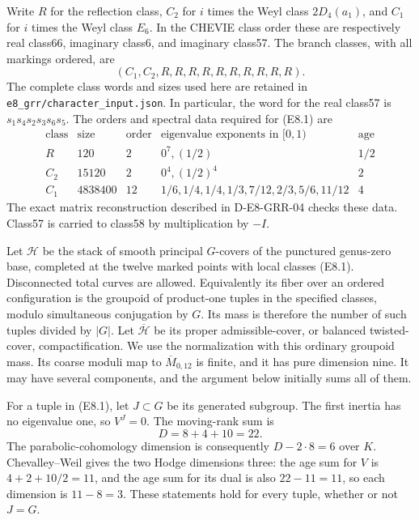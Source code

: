 Write $R$ for the reflection class, $C_2$ for $i$ times the Weyl class
$2D_4(a_1)$, and $C_1$ for $i$ times the Weyl class $E_6$.  In the
CHEVIE class order these are respectively real class66, imaginary
class6, and imaginary class57.  The branch classes, with all markings
ordered, are
\[
                 (C_1,C_2,R,R,R,R,R,R,R,R,R,R).                 \tag{E8.1}
\]
The complete class words and sizes used here are retained in
\texttt{e8\_grr/character\_input.json}.  In particular, the word for
the real class57 is $s_1s_4s_2s_3s_6s_5$.  The orders and spectral
data required for (E8.1) are
\[
\begin{array}{c|r|r|l|r}
\text{class}&\text{size}&\text{order}&\text{eigenvalue exponents in }[0,1)
 &\text{age}\\\hline
R&120&2&0^7,(1/2)&1/2\\
C_2&15120&2&0^4,(1/2)^4&2\\
C_1&4838400&12&1/6,1/4,1/4,1/3,7/12,2/3,5/6,11/12&4
\end{array}                                                     \tag{E8.2}
\]
The exact matrix reconstruction described in D-E8-GRR-04 checks these
data.  Class57 is carried to class58 by multiplication by $-I$.

Let $\mathcal H$ be the stack of smooth principal $G$-covers of the
punctured genus-zero base, completed at the twelve marked points
with local classes (E8.1).  Disconnected total curves are allowed.
Equivalently its fiber over an ordered configuration is the groupoid
of product-one tuples in the specified classes, modulo simultaneous
conjugation by $G$.  Its mass is therefore the number of such tuples
divided by $|G|$.  Let $\overline{\mathcal H}$ be its proper
admissible-cover, or balanced twisted-cover, compactification.  We
use the normalization with this ordinary groupoid mass.  Its coarse
moduli map to $\overline M_{0,12}$ is finite, and it has pure
dimension nine.  It may have
several components, and the argument below initially sums all of them.

For a tuple in (E8.1), let $J\subset G$ be its generated subgroup.
The first inertia has no eigenvalue one, so $V^J=0$.  The moving-rank
sum is
\[
                 D=8+4+10=22.
\]
The parabolic-cohomology dimension is consequently $D-2\cdot8=6$
over $K$.  Chevalley--Weil gives the two Hodge dimensions three:
the age sum for $V$ is $4+2+10/2=11$, and the age sum for its dual
is also $22-11=11$, so each dimension is $11-8=3$.
These statements hold for every tuple, whether or not $J=G$.

